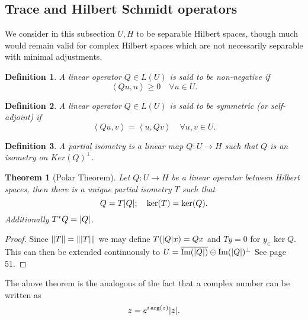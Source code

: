 \documentclass[12pt]{article}
\newtheorem{theorem}{Theorem}
\newtheorem{definition}{Definition}
\newcommand{\br}[1]{\left\langle#1\right\rangle}
\begin{document}
\subsection{Trace and Hilbert Schmidt operators}
We consider in this subsection $U,H$ to be separable Hilbert spaces, though much would remain valid for complex Hilbert spaces which are not necessarily separable with minimal adjustments.
\begin{definition}
    A linear operator $Q\in L(U)$ is said to be non-negative if
    \begin{equation*}
        \br{Qu,u}\geq 0\quad\forall u\in U.
    \end{equation*}
\end{definition}
\begin{definition}
    A linear operator $Q\in L(U)$ is said to be symmetric (or self-adjoint) if
    \begin{equation*}
        \br{Qu,v}=\br{u,Qv}\quad\forall u,v\in U.
    \end{equation*}
\end{definition}
\begin{definition}
    A partial isometry is a linear map $Q:U\to H$ such that $Q$ is an isometry on $Ker(Q)^\perp$.
\end{definition}
\begin{theorem}[Polar Theorem]
    Let $Q:U\to H$ be a linear operator between Hilbert spaces, then there is a unique partial isometry $T$ such that
    \begin{equation*}
        Q=T\abs{Q};\quad \ker(T)=\ker(Q).
    \end{equation*}
    Additionally $T^*Q=\abs{Q}$.
\end{theorem}
\begin{proof}
    Since $\norm{T}=\norm{\abs{T}}$ we may define $T(\abs{Q}x)=Qx$ and  $Ty=0$ for  $y_\in \ker{Q}$. This can then be extended continuously to $U=\overline{\Im(\abs{Q})}\oplus \Im(\abs{Q})^\perp$   See \cite{murphy2014c} page 51.
\end{proof}

The above theorem is the analogous of the fact that a complex number can be written as
\begin{equation*}
    z=e^{i\arg(z)}\abs{z}.
\end{equation*}
\end{document}
